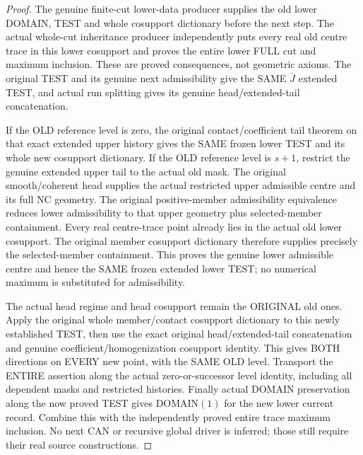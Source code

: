\begin{proof}
The genuine finite-cut lower-data producer supplies the old lower DOMAIN,
TEST and whole cosupport dictionary before the next step. The actual
whole-cut inheritance producer independently puts every real old centre
trace in this lower cosupport and proves the entire lower FULL cut and
maximum inclusion. These are proved consequences, not geometric axioms.
The original TEST and its genuine next admissibility give the SAME
$\bar J$ extended TEST, and actual run splitting gives its genuine
head/extended-tail concatenation.

If the OLD reference level is zero, the original contact/coefficient tail
theorem on that exact extended upper history gives the SAME frozen lower
TEST and its whole new cosupport dictionary. If the OLD reference level
is $s+1$, restrict the genuine extended upper tail to the actual old mask.
The original smooth/coherent head supplies the actual restricted upper
admissible centre and its full NC geometry. The original positive-member
admissibility equivalence reduces lower admissibility to that upper
geometry plus selected-member containment. Every real centre-trace point
already lies in the actual old lower cosupport. The original member
cosupport dictionary therefore supplies precisely the selected-member
containment. This proves the genuine lower admissible centre and hence
the SAME frozen extended lower TEST; no numerical maximum is substituted
for admissibility.

The actual head regime and head cosupport remain the ORIGINAL old ones.
Apply the original whole member/contact cosupport dictionary to this
newly established TEST, then use the exact original head/extended-tail
concatenation and genuine coefficient/homogenization cosupport identity.
This gives BOTH directions on EVERY new point, with the SAME OLD level.
Transport the ENTIRE assertion along the actual zero-or-successor level
identity, including all dependent masks and restricted histories. Finally
actual DOMAIN preservation along the now proved TEST gives DOMAIN$(1)$
for the new lower current record. Combine this with the independently
proved entire trace maximum inclusion. No next CAN or recursive global
driver is inferred; those still require their real source constructions.
\end{proof}
